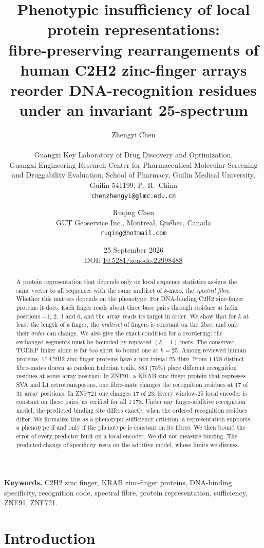 \documentclass[11pt]{article}
\title{\bfseries Phenotypic insufficiency of local protein representations:\\
fibre-preserving rearrangements of human C2H2 zinc-finger arrays\\ reorder DNA-recognition residues under an
invariant 25-spectrum}
\author{Zhengyi Chen\\[2pt]
\normalsize\begin{tabular}{c}
Guangxi Key Laboratory of Drug Discovery and Optimization,\\
Guangxi Engineering Research Center for Pharmaceutical Molecular Screening\\
and Druggability Evaluation, School of Pharmacy, Guilin Medical University,\\
Guilin 541199, P.~R.~China\\
\texttt{chenzhengyi@glmc.edu.cn}
\end{tabular}
\and
Ruqing Chen\\[2pt]
\normalsize GUT Geoservice Inc., Montreal, Qu\'ebec, Canada\\
\normalsize\texttt{ruqing@hotmail.com}}
\date{25 September 2026\\[4pt]\small DOI: \href{https://doi.org/10.5281/zenodo.22998488}{10.5281/zenodo.22998488}}
\theoremstyle{plain}
\theoremstyle{definition}
\theoremstyle{remark}
\begin{document}
\maketitle

\begin{abstract}
\noindent
A protein representation that depends only on local sequence statistics assigns the same vector to all
sequences with the same multiset of $k$-mers, the \emph{spectral fibre}. Whether this matters depends on the
phenotype. For DNA-binding C2H2 zinc-finger proteins it does. Each finger reads about three base pairs through
residues at helix positions $-1$, $2$, $3$ and $6$, and the array reads its target in order. We show that for
$k$ at least the length of a finger, the \emph{multiset} of fingers is constant on the fibre, and only their
\emph{order} can change. We also give the exact condition for a reordering: the exchanged segments must be
bounded by repeated $(k-1)$-mers. The conserved TGEKP linker alone is far too short to bound one at $k=25$.
Among reviewed human proteins, $17$ C2H2 zinc-finger proteins have a non-trivial $25$-fibre. From $1\,178$
distinct fibre-mates drawn as random Eulerian trails, $883$ ($75\%$) place different recognition residues at
some array position. In ZNF91, a KRAB zinc-finger protein that represses SVA and L1 retrotransposons, one
fibre-mate changes the recognition residues at $17$ of $31$ array positions. In ZNF721 one changes $17$ of $23$.
Every window-$25$ local encoder is constant on these pairs, as verified for all $1\,178$. Under any
finger-additive recognition model, the predicted binding site differs exactly when the ordered recognition
residues differ. We formalize this as a phenotypic sufficiency criterion: a representation supports a
phenotype if and only if the phenotype is constant on its fibres. We then bound the error of every predictor
built on a local encoder. We did not measure binding. The predicted change of specificity rests on the additive
model, whose limits we discuss.
\end{abstract}

\medskip
\noindent\textbf{Keywords.} C2H2 zinc finger, KRAB zinc-finger proteins, DNA-binding specificity, recognition
code, spectral fibre, protein representation, sufficiency, ZNF91, ZNF721.

\section{Introduction}\label{sec:intro}
\end{document}
